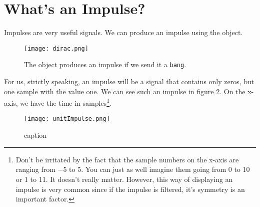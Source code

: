 
\section{What's an Impulse?}

Impulses are very useful signals. We can produce an impulse using the  object.

\begin{figure}[H]
	\begin{center}
		\texttt{[image: dirac.png]}
		\caption[The dirac object]
		{The  object produces an impulse if we send it a \texttt{bang}.}
		\label{fig:name}
	\end{center}
\end{figure}

For us, strictly speaking, an impulse will be a signal that contains only zeros, but one sample with the value one. We can see such an impulse in figure \ref{fig:unitImpulse}. On the x-axis, we have the time in samples\footnote{Don't be irritated by the fact that the sample numbers on the x-axis are ranging from $-5$ to $5$. You can just as well imagine them going from 0 to 10 or 1 to 11. It doesn't really matter. However, this way of displaying an impulse is very common since if the impulse is filtered, it's symmetry is an important factor.}.


\begin{figure}[H]
	\begin{center}
		\texttt{[image: unitImpulse.png]}
		\caption{caption}
		\label{fig:unitImpulse}
	\end{center}
\end{figure}

